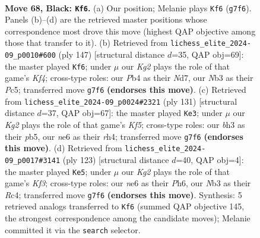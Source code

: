\documentclass[11pt]{article}
\begin{document}
\begin{figure}[p]\centering
\begin{subfigure}{0.46\textwidth}\centering
\resizebox{\linewidth}{!}{%
\newchessgame
\chessboard[
  setfen={b7/P5k1/4N3/8/1p3P2/1n4PB/4K2P/R7 b - - 5 68},
  showmover=false,
  pgfstyle=straightmove, color=movearrow, markmove={g7-f6}
]}
\caption{}
\end{subfigure}\hfill
\begin{subfigure}{0.46\textwidth}\centering
\resizebox{\linewidth}{!}{%
\newchessgame
\chessboard[
  setfen={8/3n4/3N4/1PpP1k2/2P5/8/1K6/6r1 b - - 6 74},
  showmover=false,
  pgfstyle=straightmove, color=movearrow, markmove={f5-f6}
]}
\caption{}
\end{subfigure}
\\[4pt]
\begin{subfigure}{0.46\textwidth}\centering
\resizebox{\linewidth}{!}{%
\newchessgame
\chessboard[
  setfen={8/8/3p4/1P1P2n1/2P2k1R/7B/r7/5K2 b - - 0 66},
  showmover=false,
  pgfstyle=straightmove, color=movearrow, markmove={f4-e3}
]}
\caption{}
\end{subfigure}\hfill
\begin{subfigure}{0.46\textwidth}\centering
\resizebox{\linewidth}{!}{%
\newchessgame
\chessboard[
  setfen={8/3R4/2p2k1p/8/2r2N2/4K1P1/4P2P/1b6 b - - 23 62},
  showmover=false,
  pgfstyle=straightmove, color=movearrow, markmove={f6-e5}
]}
\caption{}
\end{subfigure}
\caption{\textbf{Move 68, Black: \texttt{Kf6}.} (a) Our position; Melanie plays \texttt{Kf6} (\texttt{g7f6}). Panels (b)--(d) are the retrieved master positions whose correspondence most drove this move (highest QAP objective among those that transfer to it). (b) Retrieved from \texttt{lichess\_elite\_2024-09\_p0010\#600} (ply 147) [structural distance $d$=35, QAP obj=69]: the master played \texttt{Kf6}; under $\mu$ our \emph{Kg2} plays the role of that game's \emph{Kf4}; cross-type roles: our \emph{P}b4 as their \emph{N}d7, our \emph{N}b3 as their \emph{P}c5; transferred move \texttt{g7f6} \textbf{(endorses this move)}. (c) Retrieved from \texttt{lichess\_elite\_2024-09\_p0024\#2321} (ply 131) [structural distance $d$=37, QAP obj=67]: the master played \texttt{Ke3}; under $\mu$ our \emph{Kg2} plays the role of that game's \emph{Kf5}; cross-type roles: our \emph{b}h3 as their \emph{p}b5, our \emph{n}e6 as their \emph{r}h4; transferred move \texttt{g7f6} \textbf{(endorses this move)}. (d) Retrieved from \texttt{lichess\_elite\_2024-09\_p0017\#3141} (ply 123) [structural distance $d$=40, QAP obj=4]: the master played \texttt{Ke5}; under $\mu$ our \emph{Kg2} plays the role of that game's \emph{Kf3}; cross-type roles: our \emph{n}e6 as their \emph{P}h6, our \emph{N}b3 as their \emph{R}c4; transferred move \texttt{g7f6} \textbf{(endorses this move)}. Synthesis: 5 retrieved analogs transferred to \texttt{Kf6} (summed QAP objective 145, the strongest correspondence among the candidate moves); Melanie committed it via the \texttt{search} selector.}
\label{fig:thought-m135}
\end{figure}
\end{document}
